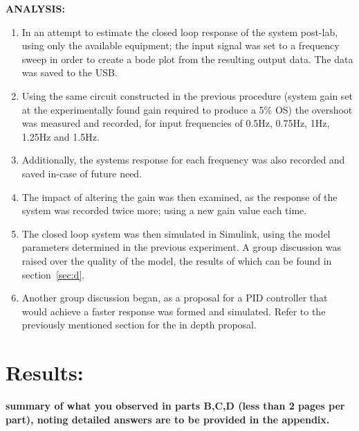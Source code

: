 \documentclass[11pt,a4paper]{article}
\begin{document}
\textbf{ANALYSIS:}
\begin{enumerate}
	\item In an attempt to estimate the closed loop response of the system post-lab, using only the available equipment; the input signal was set to a frequency sweep in order to create a bode plot from the resulting output data. The data was saved to the USB.
	\item Using the same circuit constructed in the previous procedure (system gain set at the experimentally found gain required to produce a 5\% OS) the overshoot was measured and recorded, for input frequencies of 0.5Hz, 0.75Hz, 1Hz, 1.25Hz and 1.5Hz. 
	\item Additionally, the systems response for each frequency was also recorded and saved in-case of future need.
	\item The impact of altering the gain was then examined, as the response of the system was recorded twice more; using a new gain value each time.
	\item The closed loop system was then simulated in Simulink, using the model parameters determined in the previous experiment. A group discussion was raised over the quality of the model, the results of which can be found in section~\ref{sec:d}.
	\item Another group discussion began, as a proposal for a PID controller that would achieve a faster response was formed and simulated. Refer to the previously mentioned section for the in depth proposal.
\end{enumerate}








\pagebreak
\section{Results:}
\textbf{summary of what you observed in parts B,C,D (less than 2 pages per part), noting detailed answers are to be provided in the appendix.}
\end{document}
